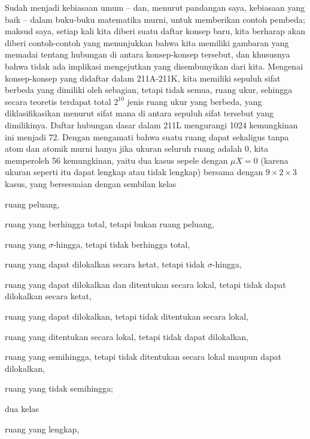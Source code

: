 
\def\chaptername{Taksonomi ruang ukur}
\def\sectionname{Contoh-contoh}


Sudah menjadi kebiasaan umum -- dan, menurut pandangan saya, kebiasaan
yang baik -- dalam buku-buku matematika murni, untuk memberikan contoh
pembeda;  maksud saya, setiap kali kita diberi suatu daftar konsep baru,
kita berharap akan diberi contoh-contoh yang menunjukkan bahwa kita
memiliki gambaran yang memadai tentang hubungan di antara konsep-konsep
tersebut, dan khususnya bahwa tidak ada implikasi mengejutkan yang
disembunyikan dari kita.   Mengenai konsep-konsep yang didaftar dalam
211A-211K, %
kita memiliki sepuluh sifat berbeda yang dimiliki oleh sebagian, tetapi
tidak semua, ruang ukur, sehingga secara teoretis terdapat total $2^{10}$
jenis ruang ukur yang berbeda, yang diklasifikasikan menurut sifat mana
di antara sepuluh sifat tersebut yang dimilikinya.   Daftar hubungan dasar
dalam 211L mengurangi 1024 kemungkinan ini menjadi 72.   Dengan mengamati
bahwa suatu ruang dapat sekaligus tanpa atom dan atomik murni hanya jika
ukuran seluruh ruang adalah $0$, kita memperoleh 56 kemungkinan, yaitu dua
kasus sepele dengan $\mu X=0$ (karena ukuran seperti itu dapat lengkap atau
tidak lengkap) bersama dengan $9\times 2\times 3$ kasus, yang bersesuaian
dengan sembilan kelas

\quad ruang peluang,

\quad ruang yang berhingga total, tetapi bukan ruang peluang,

\quad ruang yang $\sigma$-hingga, tetapi tidak berhingga total,

\quad ruang yang dapat dilokalkan secara ketat, tetapi tidak $\sigma$-hingga,

\quad ruang yang dapat dilokalkan dan ditentukan secara lokal, tetapi tidak
dapat dilokalkan secara ketat,

\quad ruang yang dapat dilokalkan, tetapi tidak ditentukan secara lokal,

\quad ruang yang ditentukan secara lokal, tetapi tidak dapat dilokalkan,

\quad ruang yang semihingga, tetapi tidak ditentukan secara lokal maupun
dapat dilokalkan,

\quad ruang yang tidak semihingga;

\noindent dua kelas

\quad ruang yang lengkap,

